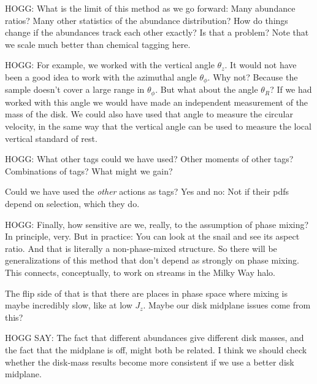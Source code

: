 \documentclass[modern]{aastex63}
\begin{document}
HOGG: What is the limit of this method as we go forward: Many abundance ratios? Many other
statistics of the abundance distribution? How do things change if the abundances track
each other exactly? Is that a problem? Note that we scale much better than chemical tagging
here.

HOGG: For example, we worked with the vertical angle $\theta_z$. It
would not have been a good idea to work with the azimuthal angle
$\theta_\phi$. Why not? Because the sample doesn't cover a large range
in $\theta_\phi$. But what about the angle $\theta_R$? If we had
worked with this angle we would have made an independent measurement
of the mass of the disk. We could also have used that angle to measure
the circular velocity, in the same way that the vertical angle can be
used to measure the local vertical standard of rest.

HOGG: What other tags could we have used? Other moments of other tags?
Combinations of tags? What might we gain?

Could we have used the \emph{other} actions as tags? Yes and no: Not if
their pdfs depend on selection, which they do.

HOGG: Finally, how sensitive are we, really, to the assumption of
phase mixing? In principle, very. But in practice: You can look at the
snail and see its aspect ratio. And that is literally a
non-phase-mixed structure. So there will be generalizations of this
method that don't depend as strongly on phase mixing. This connects,
conceptually, to work on streams in the Milky Way halo.

The flip side of that is that there are places in phase space where
mixing is maybe incredibly slow, like at low $J_z$. Maybe our disk
midplane issues come from this?

HOGG SAY: The fact that different abundances give
different disk masses, and the fact that the midplane is off, might
both be related. I think we should check whether the disk-mass results
become more consistent if we use a better disk midplane.
\end{document}
